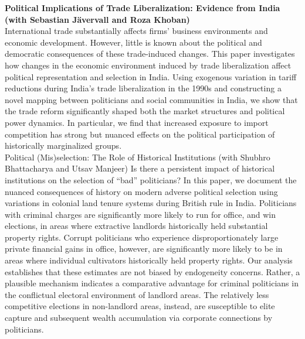 \documentclass[11pt]{article}
\newcommand{\schoolwithcourses}[4]{
 \textbf{#1} \hfill{#2}\\
    #3\\
\vspace*{5pt}
}
\begin{document}
\schoolwithcourses{Political Implications of Trade Liberalization: Evidence from India \textnormal{(with Sebastian J\"{a}vervall and Roza Khoban)}}{}{\vspace{2mm} International trade substantially affects firms' business environments and economic development. However, little is known about the political and democratic consequences of these trade-induced changes. This paper investigates how changes in the economic environment induced by trade liberalization affect political representation and selection in India. Using exogenous variation in tariff reductions during India's trade liberalization in the 1990s and constructing a novel mapping between politicians and social communities in India, we show that the trade reform significantly shaped both the market structures and political power dynamics. In particular, we find that increased exposure to import competition has strong but nuanced effects on the political participation of historically marginalized groups. \vspace{2mm}}

\schoolwithcourses{Political (Mis)selection: The Role of Historical Institutions \textnormal{(with Shubhro Bhattacharya and Utsav Manjeer)}}{}{\vspace{2mm} Is there a persistent impact of historical institutions on the selection of ``bad'' politicians? In this paper, we document the nuanced consequences of history on modern adverse political selection using variations in colonial land tenure systems during British rule in India. Politicians with criminal charges are significantly more likely to run for office, and win elections, in areas where extractive landlords historically held substantial property rights. Corrupt politicians who experience disproportionately large private financial gains in office, however, are significantly more likely to be in areas where individual cultivators historically held property rights. Our analysis establishes that these estimates are not biased by endogeneity concerns. Rather, a plausible mechanism indicates a comparative advantage for criminal politicians in the conflictual electoral environment of landlord areas. The relatively less competitive elections in non-landlord areas, instead, are susceptible to elite capture and subsequent wealth accumulation via corporate connections by politicians.}  

\vspace{1mm}


\end{document}
